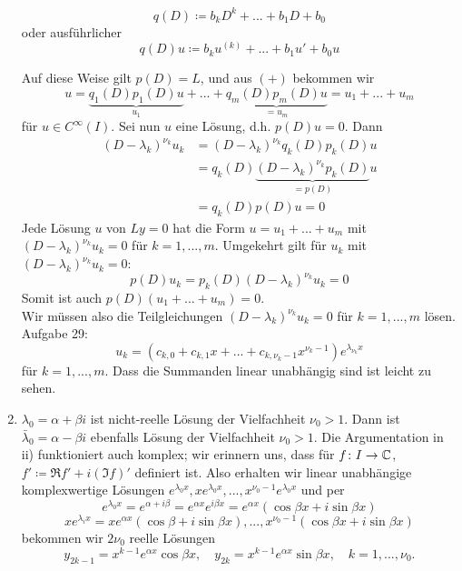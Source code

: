 \begin{enumerate}
\begin{bemerkung*}[Schreibweise]
 		\[ q(D)\coloneqq b_kD^k+...+b_1 D+b_0 \]
 		oder ausf\"uhrlicher
 		\[ q(D)u\coloneqq b_ku^{(k)}+...+b_1u'+b_0u \]
 	\end{bemerkung*} 
 	Auf diese Weise gilt $ p(D)=L $, und aus $ (+) $ bekommen wir
 	\[ u=\underbrace{q_1(D)p_1(D)u}_{u_1}+...+\underbrace{q_m(D)p_m(D)u}_{=u_m}=u_1+...+u_m \]
 	f\"ur $ u\in C^\infty(I) $. Sei nun $ u $ eine L\"osung, d.h. $ p(D)u=0 $. Dann 
 	\begin{align*}
 	(D-\lambda_k)^{\nu_k}u_k&=(D-\lambda_k)^{\nu_k}q_k(D)p_k(D)u\\&=q_k(D)\underbrace{(D-\lambda_k)^{\nu_k}p_k(D)}_{=p(D)}u\\
 	&=q_k(D)p(D)u=0
 	\end{align*}
 	Jede L\"osung $ u $ von $ Ly=0 $ hat die Form $ u=u_1+...+u_m $ mit $ (D-\lambda_k)^{\nu_k}u_k=0 $ f\"ur $ k=1,...,m $. Umgekehrt gilt f\"ur $ u_k $ mit $ (D-\lambda_k)^{\nu_k}u_k=0 $:
 	\[ p(D)u_k=p_k(D)(D-\lambda_k)^{\nu_k}u_k=0 \]
 	Somit ist auch $ p(D)(u_1+...+u_m)=0 $.\\
 	Wir m\"ussen also die Teilgleichungen $ (D-\lambda_k)^{\nu_k}u_k=0 $ f\"ur $ k=1,...,m $ l\"osen. Aufgabe 29:
 	\[ u_k=(c_{k,0}+c_{k,1}x+...+c_{k,\nu_k-1}x^{\nu_k-1})e^{\lambda_{\nu_k}x} \]
 	f\"ur $ k=1,...,m $. Dass die Summanden linear unabh\"angig sind ist leicht zu sehen.
 	\item $ \lambda_0=\alpha+\beta i $ ist nicht-reelle L\"osung der Vielfachheit $ \nu_0>1 $. Dann ist $ \bar{\lambda}_0=\alpha-\beta i $ ebenfalls L\"osung der Vielfachheit $ \nu_0>1 $. Die Argumentation in ii) funktioniert auch komplex; wir erinnern uns, dass f\"ur $ f\colon I\rightarrow\mathbb{C} $, $ f'\coloneqq\Re f'+i(\Im f)' $ definiert ist. Also erhalten wir linear unabh\"angige komplexwertige L\"osungen $ e^{\lambda_0 x}, xe^{\lambda_0 x},..., x^{\nu_0-1}e^{\lambda_0 x} $ und per \[ e^{\lambda_0 x}=e^{\alpha+i\beta}=e^{\alpha x}e^{i\beta x}=e^{\alpha x}(\cos\beta x+i\sin\beta x) \]
 	\[ xe^{\lambda_i x}=xe^{\alpha x}(\cos\beta+i\sin\beta x),...,x^{\nu_0-1}(\cos\beta x+i\sin\beta x) \]
 	bekommen wir $ 2\nu_0 $ reelle L\"osungen
 	\[ y_{2k-1}=x^{k-1}e^{\alpha x}\cos\beta x,\quad y_{2k}=x^{k-1}e^{\alpha x}\sin\beta x,\quad k=1,...,\nu_0. \]
 \end{enumerate}
